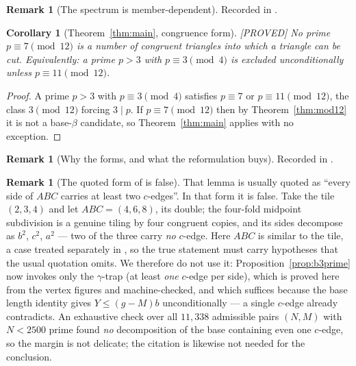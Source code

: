 \documentclass[11pt,reqno]{amsart}
\theoremstyle{plain}
\newtheorem{corollary}[theorem]{Corollary}
\theoremstyle{definition}
\newtheorem{remark}[theorem]{Remark}
\newcommand{\lab}[1]{\hfill\textnormal{\footnotesize\textsc{[#1]}}}
\begin{document}
\begin{remark}[The spectrum is member-dependent]\label{rem:memberdep}
Recorded in \cite{Obstructions}.
\end{remark}

\begin{corollary}[Theorem~\ref{thm:main}, congruence form]\label{cor:mod12}\lab{PROVED}
No prime $p\equiv7\pmod{12}$ is a number of congruent triangles into which a triangle can be cut.
Equivalently: a prime $p>3$ with $p\equiv3\pmod4$ is excluded unconditionally unless
$p\equiv11\pmod{12}$.
\end{corollary}

\begin{proof}
A prime $p>3$ with $p\equiv3\pmod4$ satisfies $p\equiv7$ or $p\equiv11\pmod{12}$, the class
$3\pmod{12}$ forcing $3\mid p$. If $p\equiv7\pmod{12}$ then by Theorem~\ref{thm:mod12} it is not a
base-$\beta$ candidate, so Theorem~\ref{thm:main} applies with no exception.
\end{proof}

\begin{remark}[Why the forms, and what the reformulation buys]\label{rem:forms}
Recorded in \cite{Obstructions}.
\end{remark}

\begin{remark}[The quoted form of {\cite[Lem.~6]{BeesonIII}} is false]\label{rem:lem6false}
That lemma is usually quoted as ``every side of $ABC$ carries at least two $c$-edges''. In that form
it is false. Take the tile $(2,3,4)$ and let $ABC=(4,6,8)$, its double; the four-fold midpoint
subdivision is a genuine tiling by four congruent copies, and its sides decompose as $b^2$, $c^2$,
$a^2$ --- two of the three carry \emph{no} $c$-edge. Here $ABC$ is similar to the tile, a case treated
separately in \cite{BeesonIII}, so the true statement must carry hypotheses that the usual quotation
omits. We therefore do not use it: Proposition~\ref{prop:b3prime} now invokes only the $\gamma$-trap
(at least \emph{one} $c$-edge per side), which is proved here from the vertex figures and
machine-checked, and which suffices because the base length identity gives $Y\le(g-M)b$
unconditionally --- a single $c$-edge already contradicts. An exhaustive check over all
$11{,}338$ admissible pairs $(N,M)$ with $N<2500$ prime found \emph{no} decomposition of the base
containing even one $c$-edge, so the margin is not delicate; the citation
\cite[Lem.~45(iii)]{BeesonIII} is likewise not needed for the conclusion.
\end{remark}
\end{document}
